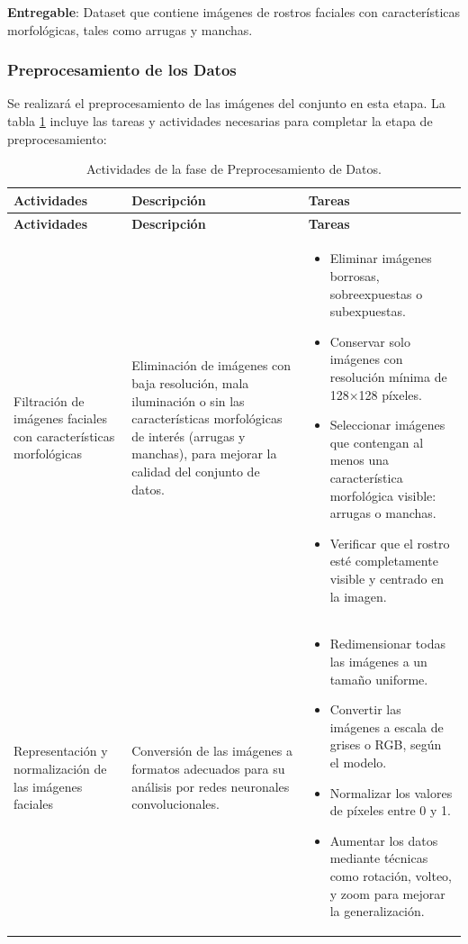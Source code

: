  \textbf{Entregable}: Dataset que contiene imágenes de rostros faciales con características morfológicas, tales como arrugas y manchas.

\subsubsection{Preprocesamiento de los Datos}
Se realizará el preprocesamiento de las imágenes del conjunto en esta etapa. La tabla \ref{tabla:preprocesamiento} incluye las tareas y actividades necesarias para completar la etapa de preprocesamiento:
\vspace{2ex}


\begin{longtable}{>{\raggedright\arraybackslash}p{4cm} >{\raggedright\arraybackslash}p{4cm} >{\raggedright\arraybackslash}p{5cm}}
    \caption{Actividades de la fase de Preprocesamiento de Datos.}
    \label{tabla:preprocesamiento}\\
    \toprule
    \textbf{Actividades} & \textbf{Descripción} & \textbf{Tareas} \\
    \midrule
    \endfirsthead

    \toprule
    \textbf{Actividades} & \textbf{Descripción} & \textbf{Tareas} \\
    \midrule
    \endhead

    \bottomrule
    \endfoot

    \bottomrule
    \endlastfoot

    Filtración de imágenes faciales con características morfológicas & Eliminación de imágenes con baja resolución, mala iluminación o sin las características morfológicas de interés (arrugas y manchas), para mejorar la calidad del conjunto de datos. & 
    \begin{itemize}
        \item Eliminar imágenes borrosas, sobreexpuestas o subexpuestas.
        \item Conservar solo imágenes con resolución mínima de 128×128 píxeles.
        \item Seleccionar imágenes que contengan al menos una característica morfológica visible: arrugas o manchas.
        \item Verificar que el rostro esté completamente visible y centrado en la imagen.
    \end{itemize} \\

    Representación y normalización de las imágenes faciales & Conversión de las imágenes a formatos adecuados para su análisis por redes neuronales convolucionales. & 
    \begin{itemize}
        \item Redimensionar todas las imágenes a un tamaño uniforme.
        \item Convertir las imágenes a escala de grises o RGB, según el modelo.
        \item Normalizar los valores de píxeles entre 0 y 1.
        \item Aumentar los datos mediante técnicas como rotación, volteo, y zoom para mejorar la generalización.
    \end{itemize} \\


\end{longtable}

